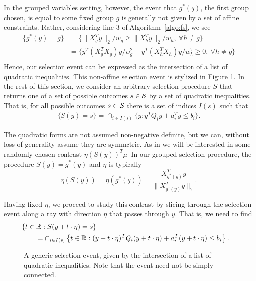 \documentclass{imsart}
\begin{document}
In the grouped variables setting, however, the event that $g^*(y)$, the first
group chosen, is equal to some fixed group $g$ is generally not given by
a set of affine constraints. Rather, considering line 3 of Algorithm~\ref{algo:fs}, we see
\begin{equation}
\label{eq:first:quadratic}
\begin{aligned}
\{g^*(y)=g\} &= \{ \|X_g^Ty\|_2 /w_g \geq \|X_h^Ty\|_2 /w_h , \ \forall h \neq g\} \\
&=  \{ y^T(X_g^TX_g)y / w_g^2 - y^T(X_h^TX_h)y / w_h^2 \geq 0, \ \forall h \neq g\} \\
\end{aligned}
\end{equation}
Hence, our selection event can be expressed as 
the intersection of a list of quadratic inequalities. This non-affine selection event is stylized in Figure
\ref{fig:curved}.
In the rest of this section, we consider an arbitrary selection procedure
$S$ that returns one of a set of possible outcomes $s \in {\cal S}$ by a set of quadratic inequalities.
That is, for all possible outcomes $s \in {\cal S}$ there is a set of indices
$I(s)$ such that
\begin{equation}
\label{eq:selection}
\begin{aligned}
\{S(y)=s\} = \cap_{i \in I(s)} \{y: y^TQ_iy + a_i^Ty\leq b_i \}.
\end{aligned}
\end{equation}

The quadratic forms are not assumed non-negative definite, but we can, without loss of generality
assume they are symmetric.
As in \cite{lasso:fixed} we will be interested in some randomly chosen contrast
$\eta(S(y))^T\mu$. In our grouped selection procedure, the procedure $S(y)=g^*(y)$
and $\eta$ is typically 
$$
\eta(S(y)) = \eta(g^*(y)) = \frac{X_{g^*(y)}^Ty}{\|X_{g^*(y)}^Ty\|_2}.
$$

Having fixed $\eta$, we proceed to study this contrast by slicing through the selection event along a ray with direction $\eta$ that passes through $y$. 
That is, we need to find
$$
\begin{aligned}
\lefteqn{
\left\{t \in \mathbb R : S(y+t \cdot \eta)=s \right\} } \\
 & \qquad = \cap_{i \in I(s)} \left\{t \in \mathbb R : (y+t \cdot \eta)^T Q_i (y+t \cdot \eta) + a_i^T(y+t \cdot \eta) \leq b_i\right\}. \\
\end{aligned}
$$

\begin{figure}
\label{fig:curved}
\begin{center}
\resizebox{!}{3in}{}
\end{center}
A generic selection event, given by the intersection of a list
of quadratic inequalities. Note that the event need not be simply connected. \end{figure}
\end{document}
